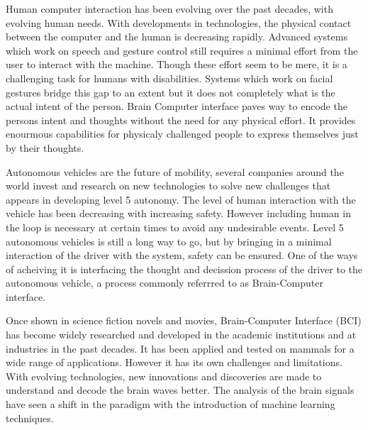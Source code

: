 Human computer interaction has been evolving over the past decades, with evolving human needs. With developments in technologies, the physical 
contact between the computer and the human is decreasing rapidly. Advanced systems which work on speech and gesture control still requires a minimal
effort from the user to interact with the machine. Though these effort seem to be mere, it is a challenging task for humans with disabilities. 
Systems which work on facial gestures bridge this gap to an extent but it does not completely what is the actual intent of the person. Brain Computer
interface paves way to encode the persons intent and thoughts without the need for any physical effort. It provides enourmous capabilities for 
physicaly challenged people to express themselves just by their thoughts. 

Autonomous vehicles are the future of mobility, several companies around the world invest and research on new technologies to solve new challenges 
that appears in developing level 5 autonomy. The level of human interaction with the vehicle has been decreasing with increasing safety. However
including human in the loop is necessary at certain times to avoid any undesirable events. Level  5 autonomous vehicles is still a long way to go, 
but by bringing in a minimal interaction of the driver with the system, safety can be ensured. One of the ways of acheiving it is interfacing the
thought and decission process of the driver to the autonomous vehicle, a process commonly referrred to as Brain-Computer interface. 

Once shown in science fiction novels and movies, Brain-Computer Interface (BCI) has become widely researched and developed in the academic institutions 
and at industries in the past decades. It has been applied and tested on mammals for a wide range of applications. However it has its own challenges
and limitations. With evolving technologies, new innovations and discoveries are made to understand and decode the brain waves better. The analysis
of the brain signals have seen a shift in the paradigm with the introduction of machine learning techniques. 

